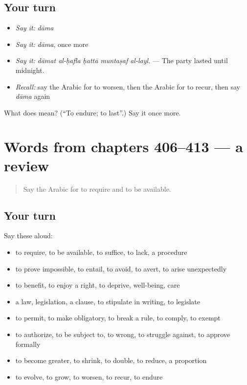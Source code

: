 \subsection*{Your turn}
\begin{itemize}
\raggedright
  \item \emph{Say it:} \emph{dāma}
  \item \emph{Say it:} \emph{dāma}, once more
  \item \emph{Say it:} \emph{dāmat al-ḥafla ḥattā muntaṣaf al-layl.} — The party lasted until midnight.
  \item \emph{Recall:} say the Arabic for to worsen, then the Arabic for to recur, then say \emph{dāma} again
\end{itemize}

\begin{tcolorbox}[breakable,colback=teal!4,colframe=teal!35!black,title={Before you move on}]
What does  mean? (\textquotedblleft{}To endure; to last\textquotedblright{}.) Say it once more.
\end{tcolorbox}
\section[(dialogue)]{Words from chapters 406–413 — a review}

\label{lesson:AR-R413-review-406-413}



\begin{quote}
Say the Arabic for to require and to be available.
\end{quote}

\subsection*{Your turn}
Say these aloud:

\begin{itemize}
\raggedright
  \item to require, to be available, to suffice, to lack, a procedure
  \item to prove impossible, to entail, to avoid, to avert, to arise unexpectedly
  \item to benefit, to enjoy a right, to deprive, well-being, care
  \item a law, legislation, a clause, to stipulate in writing, to legislate
  \item to permit, to make obligatory, to break a rule, to comply, to exempt
  \item to authorize, to be subject to, to wrong, to struggle against, to approve formally
  \item to become greater, to shrink, to double, to reduce, a proportion
  \item to evolve, to grow, to worsen, to recur, to endure
\end{itemize}

